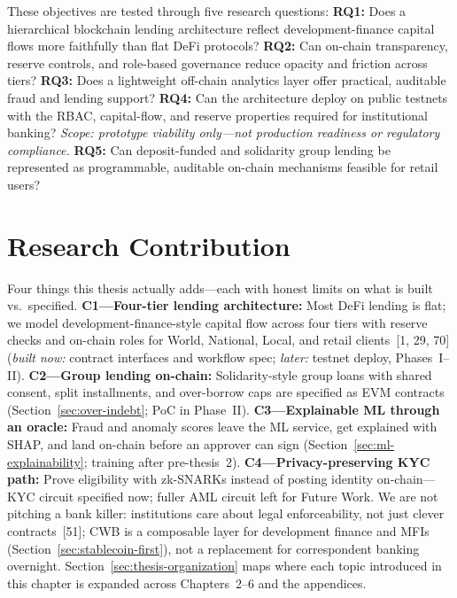 \documentclass[12pt, a4paper]{report}
\begin{document}
\noindent These objectives are tested through five research questions: \textbf{RQ1:} Does a hierarchical blockchain lending architecture reflect development-finance capital flows more faithfully than flat DeFi protocols? \textbf{RQ2:} Can on-chain transparency, reserve controls, and role-based governance reduce opacity and friction across tiers? \textbf{RQ3:} Does a lightweight off-chain analytics layer offer practical, auditable fraud and lending support? \textbf{RQ4:} Can the architecture deploy on public testnets with the RBAC, capital-flow, and reserve properties required for institutional banking? \textit{Scope: prototype viability only---not production readiness or regulatory compliance.} \textbf{RQ5:} Can deposit-funded and solidarity group lending be represented as programmable, auditable on-chain mechanisms feasible for retail users?

\section{Research Contribution}
\label{sec:research-contribution}

Four things this thesis actually adds---each with honest limits on what is built vs.\ specified. \textbf{C1---Four-tier lending architecture:} Most DeFi lending is flat; we model development-finance-style capital flow across four tiers with reserve checks and on-chain roles for World, National, Local, and retail clients~[1, 29, 70] (\textit{built now:} contract interfaces and workflow spec; \textit{later:} testnet deploy, Phases~I--II). \textbf{C2---Group lending on-chain:} Solidarity-style group loans with shared consent, split installments, and over-borrow caps are specified as EVM contracts (Section~\ref{sec:over-indebt}; PoC in Phase~II). \textbf{C3---Explainable ML through an oracle:} Fraud and anomaly scores leave the ML service, get explained with SHAP, and land on-chain before an approver can sign (Section~\ref{sec:ml-explainability}; training after pre-thesis~2). \textbf{C4---Privacy-preserving KYC path:} Prove eligibility with zk-SNARKs instead of posting identity on-chain---KYC circuit specified now; fuller AML circuit left for Future Work. We are not pitching a bank killer: institutions care about legal enforceability, not just clever contracts~[51]; CWB is a composable layer for development finance and MFIs (Section~\ref{sec:stablecoin-first}), not a replacement for correspondent banking overnight. Section~\ref{sec:thesis-organization} maps where each topic introduced in this chapter is expanded across Chapters~2--6 and the appendices.
\end{document}
